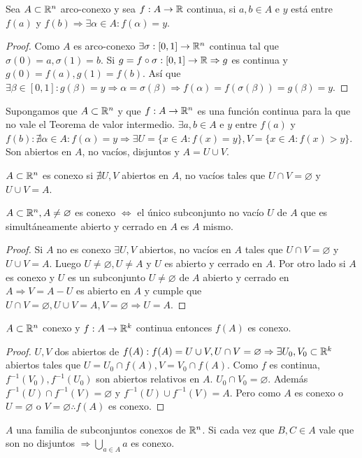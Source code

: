 \begin{prop}
  Sea $A \subset \mathbb{R}^n$ arco-conexo y sea $f: A \to \mathbb{R}$ continua, si $a, b \in A$ e $y$ está entre $f(a)$ y $f(b) \Rightarrow \exists \alpha \in A : f(\alpha) = y$.
  \begin{proof}
    Como $A$ es arco-conexo $\exists \sigma: [0, 1] \to \mathbb{R}^n$ continua tal que $\sigma(0) = a, \sigma(1) = b$. Si $g = f \circ \sigma: [0, 1] \to \mathbb{R} \Rightarrow g$ es continua y $g(0) = f(a), g(1) = f(b)$. Así que $\exists \beta \in [0, 1] : g(\beta) = y \Rightarrow \alpha = \sigma(\beta) \Rightarrow f(\alpha) = f(\sigma(\beta)) = g(\beta) = y$.
  \end{proof}
\end{prop}

\begin{note}
  Supongamos que $A \subset \mathbb{R}^n$ y que $f: A \to \mathbb{R}^n$ es una función continua para la que no vale el Teorema de valor intermedio. $\exists a, b \in A$ e $y$ entre $f(a)$ y $f(b) : \nexists \alpha \in A : f(\alpha) = y \Rightarrow \exists U = \{ x \in A : f(x) = y \}, V = \{ x \in A : f(x) > y \}$. Son abiertos en $A$, no vacíos, disjuntos y $A = U \cup V$.
\end{note}

\begin{definition}[Conexo]
  $A \subset \mathbb{R}^n$ es conexo si $\nexists U, V$ abiertos en $A$, no vacíos tales que $U \cap V = \varnothing$ y $U \cup V = A$.
\end{definition}

\begin{prop}
  $A \subset \mathbb{R}^n, A \neq \varnothing$ es conexo $\iff$ el único subconjunto no vacío $U$ de $A$ que es simultáneamente abierto y cerrado en $A$ es $A$ mismo.
  \begin{proof}
    Si $A$ no es conexo $\exists U, V$ abiertos, no vacíos en $A$ tales que $U \cap V = \varnothing$ y $U \cup V = A$. Luego $U \neq \varnothing, U \neq A$ y $U$ es abierto y cerrado en $A$. Por otro lado si $A$ es conexo y $U$ es un subconjunto $U \neq \varnothing$ de $A$ abierto y cerrado en $A \Rightarrow V = A - U$ es abierto en $A$ y cumple que $U \cap V = \varnothing, U \cup V = A, V = \varnothing \Rightarrow U = A$.
  \end{proof}
\end{prop}

\clearpage

\begin{theorem}
  $A \subset \mathbb{R}^n$ conexo y $f: A \to \mathbb{R}^k$ continua entonces $f(A)$ es conexo.
  \begin{proof}
    $U, V$ dos abiertos de $f(A) : f(A) = U \cup V, U \cap V = \varnothing \Rightarrow \exists U_0, V_0 \subset \mathbb{R}^k$ abiertos tales que $U = U_0 \cap f(A), V = V_0 \cap f(A)$. Como $f$ es continua, $f^{-1}(V_0), f^{-1}(U_0)$ son abiertos relativos en $A$. $U_0 \cap V_0 = \varnothing$. Además $f^{-1}(U) \cap f^{-1}(V) = \varnothing$ y $f^{-1}(U) \cup f^{-1}(V) = A$. Pero como $A$ es conexo o $ U = \varnothing$ o $V = \varnothing \therefore f(A)$ es conexo.
  \end{proof}
\end{theorem}

\begin{prop}
  $A$ una familia de subconjuntos conexos de $\mathbb{R}^n$. Si cada vez que $B, C \in A$ vale que son no disjuntos $\Rightarrow \bigcup_{a \in A} a$ es conexo.
\end{prop}
